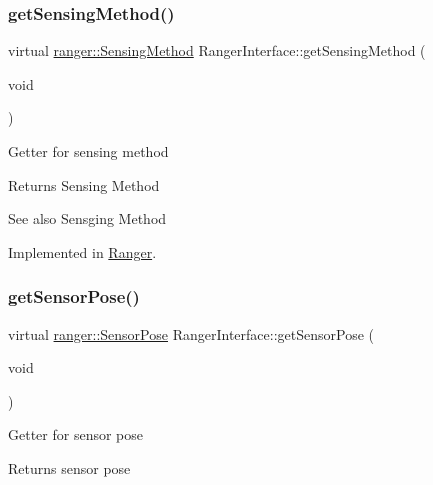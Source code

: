 \mbox{\label{classRangerInterface_aeb06b9835f2b162b81917bd27797549b}} 
\subsubsection{\texorpdfstring{get\+Sensing\+Method()}{getSensingMethod()}}
{\footnotesize\ttfamily virtual \hyperlink{namespaceranger_ab04465c229cc50595ffe40a891a3b135}{ranger\+::\+Sensing\+Method} Ranger\+Interface\+::get\+Sensing\+Method (\begin{DoxyParamCaption}\item[{void}]{ }\end{DoxyParamCaption})\hspace{0.3cm}{\ttfamily [pure virtual]}}

Getter for sensing method \begin{DoxyReturn}{Returns}
Sensing Method 
\end{DoxyReturn}
\begin{DoxySeeAlso}{See also}
Sensging Method 
\end{DoxySeeAlso}


Implemented in \hyperlink{classRanger_a47e30b7ec55adec5bb542278ccfee140}{Ranger}.

\mbox{\label{classRangerInterface_a7f6db3f603d997ad6c5aa5c7778261f4}} 
\subsubsection{\texorpdfstring{get\+Sensor\+Pose()}{getSensorPose()}}
{\footnotesize\ttfamily virtual \hyperlink{structranger_1_1SensorPose}{ranger\+::\+Sensor\+Pose} Ranger\+Interface\+::get\+Sensor\+Pose (\begin{DoxyParamCaption}\item[{void}]{ }\end{DoxyParamCaption})\hspace{0.3cm}{\ttfamily [pure virtual]}}

Getter for sensor pose \begin{DoxyReturn}{Returns}
sensor pose 
\end{DoxyReturn}


